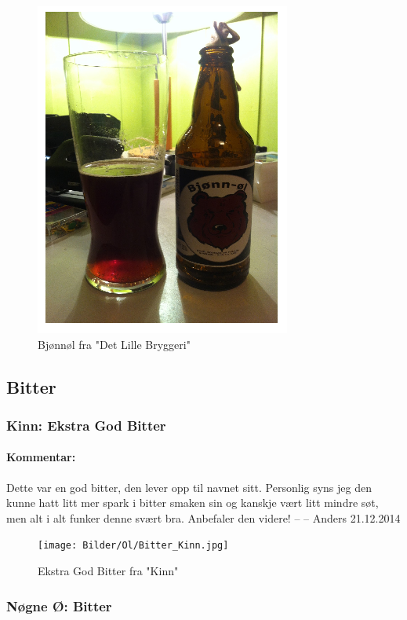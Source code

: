\documentclass[12pt,a4paper,oneside,norsk]{article}
\begin{document}
\begin{figure} [H]
\centering
\includegraphics[scale=1.00]{Bilder/Ol/bjonnol.PNG} 
\caption{Bjønnøl fra "Det Lille Bryggeri"}
\end{figure}

\newpage
\subsection{Bitter}

\subsubsection{Kinn: Ekstra God Bitter}
\paragraph{Kommentar:}Dette var en god bitter, den lever opp til navnet sitt. Personlig syns jeg den kunne hatt litt mer spark i bitter smaken sin og kanskje vært litt mindre søt, men alt i alt funker denne svært bra. Anbefaler den videre! 
\newline
-- -- Anders 21.12.2014

\begin{figure} [H]
\centering
\texttt{[image: Bilder/Ol/Bitter\_Kinn.jpg]} 
\caption{Ekstra God Bitter fra "Kinn"}
\end{figure}

\newpage

\subsubsection{Nøgne Ø: Bitter}
\end{document}

